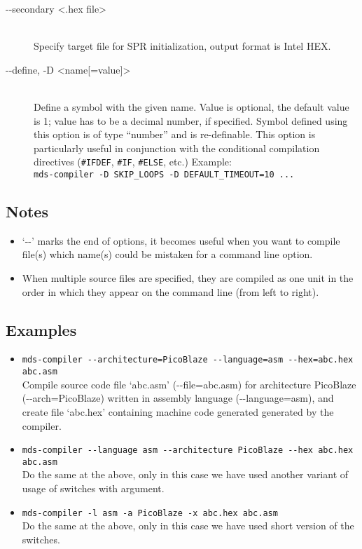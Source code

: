 \begin{description}
            \item[-{}-secondary <.hex file>]~\\
                Specify target file for SPR initialization, output format is Intel HEX.

            \item[-{}-define, -D <name{[}=value{]}>]~\\
                Define a symbol with the given name. Value is optional, the default value is 1; value has to be a decimal number, if specified. Symbol defined using this option is of type ``number'' and is re-definable. This option is particularly useful in conjunction with the conditional compilation directives (\texttt{\#IFDEF}, \texttt{\#IF}, \texttt{\#ELSE}, etc.) Example:~\\
                \verb'mds-compiler -D SKIP_LOOPS -D DEFAULT_TIMEOUT=10 ...'

        \end{description}

    \subsection{Notes}
        \begin{itemize}
            \item `-{}-' marks the end of options, it becomes useful when you want to compile file(s) which name(s) could be mistaken for a command line option.
            \item When multiple source files are specified, they are compiled as one unit in the order in which they appear on the command line (from left to right).
        \end{itemize}

    \subsection{Examples}
        \begin{itemize}
            \item \verb'mds-compiler --architecture=PicoBlaze --language=asm --hex=abc.hex abc.asm'\\
                Compile source code file `abc.asm' (-{}-file=abc.asm) for architecture PicoBlaze (-{}-arch=PicoBlaze) written in assembly language (-{}-language=asm), and create file `abc.hex' containing machine code generated generated by the compiler.

            \item \verb'mds-compiler --language asm --architecture PicoBlaze --hex abc.hex abc.asm'\\
                Do the same at the above, only in this case we have used another variant of usage of switches with argument.

            \item \verb'mds-compiler -l asm -a PicoBlaze -x abc.hex abc.asm'\\
                Do the same at the above, only in this case we have used short version of the switches.
        \end{itemize}

